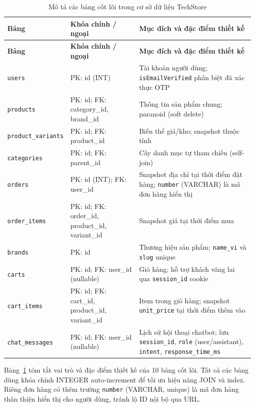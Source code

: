 \begin{longtable}{|p{4.0cm}|p{4.0cm}|p{5.5cm}|}
  \caption{Mô tả các bảng cốt lõi trong cơ sở dữ liệu TechStore}
  \label{tab:core_tables} \\
  \hline
  \textbf{Bảng} & \textbf{Khóa chính / ngoại} & \textbf{Mục đích và đặc điểm thiết kế} \\
  \hline
  \endfirsthead
  \hline
  \textbf{Bảng} & \textbf{Khóa chính / ngoại} & \textbf{Mục đích và đặc điểm thiết kế} \\
  \hline
  \endhead
  \hline
  \endfoot
  \hline
  \endlastfoot
  \texttt{users} & PK: id (INT) & Tài khoản người dùng; \texttt{isEmailVerified} phân biệt đã xác thực OTP \\
  \hline
  \texttt{products} & PK: id; FK: category\_id, brand\_id & Thông tin sản phẩm chung; paranoid (soft delete) \\
  \hline
  \texttt{product\_variants} & PK: id; FK: product\_id & Biến thể giá\slash kho; snapshot thuộc tính \\
  \hline
  \texttt{categories} & PK: id; FK: parent\_id & Cây danh mục tự tham chiếu (self-join) \\
  \hline
  \texttt{orders} & PK: id (INT); FK: user\_id & Snapshot địa chỉ tại thời điểm đặt hàng; \texttt{number} (VARCHAR) là mã đơn hàng hiển thị \\
  \hline
  \texttt{order\_items} & PK: id; FK: order\_id, product\_id, variant\_id & Snapshot giá tại thời điểm mua \\
  \hline
  \texttt{brands} & PK: id & Thương hiệu sản phẩm; \texttt{name\_vi} và \texttt{slug} unique \\
  \hline
  \texttt{carts} & PK: id; FK: user\_id (nullable) & Giỏ hàng; hỗ trợ khách vãng lai qua \texttt{session\_id} cookie \\
  \hline
  \texttt{cart\_items} & PK: id; FK: cart\_id, product\_id, variant\_id & Item trong giỏ hàng; snapshot \texttt{unit\_price} tại thời điểm thêm vào \\
  \hline
  \texttt{chat\_messages} & PK: id; FK: user\_id (nullable) & Lịch sử hội thoại chatbot; lưu \texttt{session\_id}, \texttt{role} (user\slash assistant), \texttt{intent}, \texttt{response\_time\_ms} \\
\end{longtable}

Bảng~\ref{tab:core_tables} tóm tắt vai trò và đặc điểm thiết kế của 10 bảng cốt lõi. Tất cả các bảng dùng khóa chính INTEGER auto-increment để tối ưu hiệu năng JOIN và index. Riêng đơn hàng có thêm trường \texttt{number} (VARCHAR, unique) là mã đơn hàng thân thiện hiển thị cho người dùng, tránh lộ ID nội bộ qua URL.

